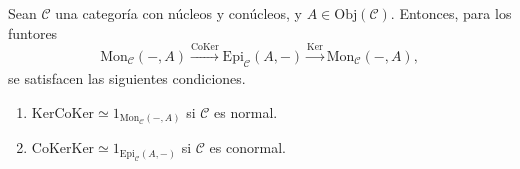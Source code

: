 \documentclass[tesis]{subfiles}
\begin{document}
\begin{Prop}\label{Mendoza-1.6.2}
    Sean $\mathscr{C}$ una categoría con núcleos y conúcleos, y $A\in\text{Obj}(\mathscr{C})$. Entonces, para los funtores
    \[
    \text{Mon}_\mathscr{C}(-,A)\xrightarrow[]{\text{CoKer}} \text{Epi}_\mathscr{C}(A,-) \xrightarrow[]{\text{Ker}} \text{Mon}_\mathscr{C}(-,A),
    \] 
    se satisfacen las siguientes condiciones.

    \begin{enumerate}[label=(\alph*)]
    
        \item $\text{Ker}\text{CoKer}\simeq 1_{\text{Mon}_\mathscr{C}(-,A)}$ si $\mathscr{C}$ es normal.

        \item $\text{CoKer}\text{Ker}\simeq 1_{\text{Epi}_\mathscr{C}(A,-)}$ si $\mathscr{C}$ es conormal.
    \end{enumerate}
\end{Prop}
\end{document}
